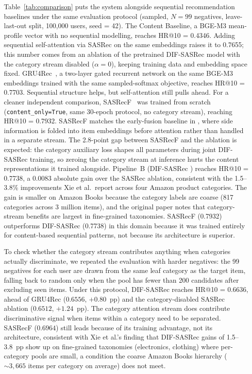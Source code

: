 Table~\ref{tab:comparison} puts the system alongside sequential recommendation baselines under the same evaluation protocol (sampled, $N{=}99$ negatives, leave-last-out split, 100,000 users, seed = 42).
The Content Baseline, a BGE-M3 mean-profile vector with no sequential modelling, reaches HR@10 = 0.4346. Adding sequential self-attention via SASRec \cite{kang2018self} on the same embeddings raises it to 0.7655; this number comes from an ablation of the pretrained DIF-SASRec model with the category stream disabled ($\alpha{=}0$), keeping training data and embedding space fixed.
GRU4Rec~\cite{hidasi2016gru4rec}, a two-layer gated recurrent network on the same BGE-M3 embeddings trained with the same sampled-softmax objective, reaches HR@10 = 0.7703. Sequential structure helps, but self-attention still pulls ahead.
For a cleaner independent comparison, SASRecF~\cite{kang2018self} was trained from scratch (\texttt{content\_only=True}, same 30-epoch protocol, no category stream), reaching HR@10 = 0.7932. SASRecF matches the early-fusion baseline in \citet{xie2022difsasrec}, where side information is folded into item embeddings before attention rather than handled in a separate stream.
The 2.8-point gap between SASRecF and the ablation is expected: the category auxiliary loss shapes all parameters during joint DIF-SASRec training, so zeroing the category stream at inference hurts the content representations it trained alongside.
Pipeline~B (DIF-SASRec \cite{xie2022difsasrec}) reaches HR@10 = 0.7738, a 0.0083 absolute gain over the SASRec ablation, consistent with the 1.5--3.8\% improvements Xie et al.\ report across four Amazon product categories. The gain is smaller on Amazon Books because the category labels are coarse (817 categories across 3 million items), and the original paper notes that category-stream benefits are largest in fine-grained taxonomies. SASRecF (0.7932) outperforms DIF-SASRec (0.7738) in this domain because it was trained entirely for content-based sequential patterns, not because its architecture is superior.

To check whether the category stream contributes anything when categories actually discriminate, we repeated the evaluation with harder negatives: the 99 negatives for each user are drawn from the same leaf category as the target item, falling back to random only when the pool has fewer than 200 candidates after excluding seen items. Under this protocol, DIF-SASRec reaches HR@10 = 0.6636, ahead of GRU4Rec ($0.6556$, $+0.80$~pp) and the category-disabled SASRec ablation ($0.6512$, $+1.24$~pp). The category attention stream does contribute discriminative signal when items within a category need to be separated. SASRecF ($0.6964$) still leads because of its training advantage, not its architecture, consistent with Xie et al.'s finding that DIF-SASRec gains of 1.5--3.8~pp show up on fine-grained taxonomies (electronics, clothing) where per-category pools are small, a condition the coarse Amazon Books hierarchy (${\sim}3{,}665$ items per category on average) does not meet.

